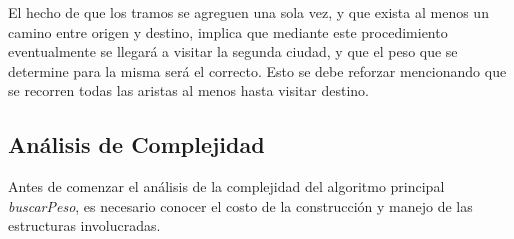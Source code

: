 \begin{itemize}
\indent El hecho de que los tramos se agreguen una sola vez, y que exista al menos un camino entre origen y destino, implica que mediante este procedimiento eventualmente se llegará a visitar la segunda ciudad, y que el peso que se determine para la misma será el correcto. Esto se debe reforzar mencionando que se recorren todas las aristas al menos hasta visitar destino.

\end{itemize}

\clearpage

\subsection{Análisis de Complejidad}

Antes de comenzar el análisis de la complejidad del algoritmo principal \textsl{buscarPeso}, es necesario conocer el costo de la construcción y manejo de las estructuras involucradas.\\

